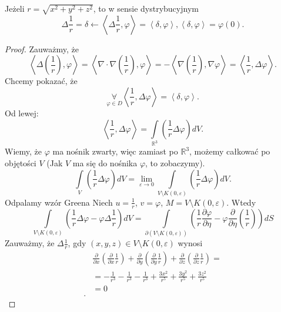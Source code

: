 \documentclass[../main.tex]{subfiles}
\begin{document}
\begin{stw}
    Jeżeli $r = \sqrt{x^2 + y^2 + z^2}$, to w sensie dystrybucyjnym
    \[
        \Delta \frac{1}{r} = \delta \longleftarrow \left<\Delta \frac{1}{r}, \varphi \right> = \left<\delta, \varphi \right>, \left<\delta, \varphi \right> = \varphi(0)
    .\]
\end{stw}
\begin{proof}
    Zauważmy, że
    \[
        \left<\Delta\left( \frac{1}{r} \right) , \varphi \right> = \left<\nabla\cdot \nabla\left( \frac{1}{r} \right) , \varphi \right> = -\left<\nabla\left( \frac{1}{r} \right) , \nabla \varphi \right> = \left<\frac{1}{r}, \Delta \varphi \right>
    .\]
Chcemy pokazać, że
\[
    \underset{\varphi\in D}{\forall} \left<\frac{1}{r}, \Delta \varphi \right> = \left<\delta, \varphi \right>
.\]
Od lewej:
\[
    \left<\frac{1}{r}, \Delta \varphi \right> = \int\limits_{\mathbb{R}^3}\left( \frac{1}{r}\Delta \varphi \right) dV
.\]
Wiemy, że $\varphi$ ma nośnik zwarty, więc zamiast po $\mathbb{R}^3$, możemy całkować po objętości $V$ (Jak $V$ ma się do nośnika $\varphi$, to zobaczymy).
\[
    \int\limits_{V}\left( \frac{1}{r}\Delta \varphi \right) dV = \lim_{\varepsilon \to 0}\int\limits_{V\setminus K(0,\varepsilon)}\left( \frac{1}{r}\Delta \varphi \right) dV
.\]
Odpalamy {\color{green} wzór Greena}
    Niech $u = \frac{1}{r}$, $v = \varphi$, $M = V\setminus K(0,\varepsilon)$. Wtedy
    \begin{equation}
        \label{eqn:w25-3}
        \int\limits_{V\setminus K(0,\varepsilon)}\left( \frac{1}{r}\Delta \varphi - \varphi\Delta \frac{1}{r} \right)dV = \int\limits_{\partial\left( V\setminus K(0,\varepsilon) \right) }\left( \frac{1}{r}\frac{\partial \varphi}{\partial \eta} - \varphi \frac{\partial }{\partial \eta} \left( \frac{1}{r} \right)  \right) dS\tag{$\clubsuit$}
    \end{equation}
    Zauważmy, że $\Delta \frac{1}{r}$, gdy $(x,y,z)\in V\setminus K(0,\varepsilon)$ wynosi
    \begin{align*}
        &\frac{\partial }{\partial x} \left( \frac{\partial }{\partial x} \frac{1}{r} \right) + \frac{\partial }{\partial y} \left( \frac{\partial }{\partial y} \frac{1}{r} \right) + \frac{\partial }{\partial z} \left( \frac{\partial }{\partial z} \frac{1}{r} \right) = \\
        &= -\frac{1}{r^3} - \frac{1}{r^3} - \frac{1}{r^3} + \frac{3x^2}{r^5} + \frac{3 y^2}{r^5} + \frac{3z^2}{r^5}\\
        &=  0 \\
    .\end{align*}

\end{proof}
\end{document}
